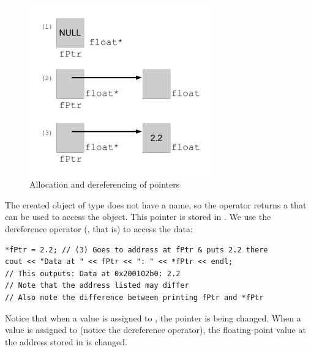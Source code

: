 \begin{figure}[tb]
  \centering
  \includegraphics[width=0.7\textwidth]{diagrams/new_operator_diagram_1.pdf}
  \caption{Allocation and dereferencing of pointers} \label{fig:new_operator_diagram_1} 
\end{figure}

The created object of type  does not have a name, so the  operator returns a  that can be used to access the object. 
This pointer is stored in . 
We use the dereference operator (\Code{*}, that is) to access the data:

\noindent\begin{minipage}{\linewidth}\begin{lstlisting}
*fPtr = 2.2; // (3) Goes to address at fPtr & puts 2.2 there
cout << "Data at " << fPtr << ": " << *fPtr << endl;
// This outputs: Data at 0x200102b0: 2.2
// Note that the address listed may differ
// Also note the difference between printing fPtr and *fPtr
\end{lstlisting}\end{minipage}

Notice that when a value is assigned to , the pointer is being changed. 
When a value is assigned to  (notice the dereference operator), the floating-point value at the address stored in  is changed. 

